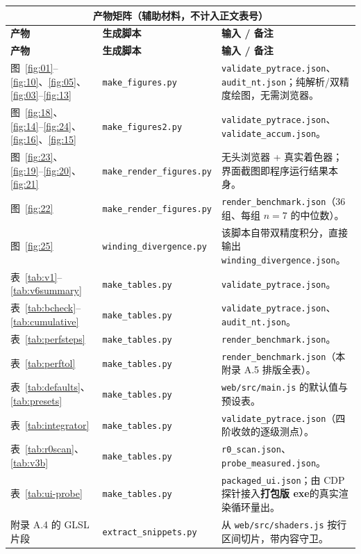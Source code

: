 \begingroup
\setlength{\LTpre}{4pt}
\setlength{\LTpost}{4pt}
\footnotesize
{}
\begin{longtable}{@{}p{3.35cm}p{4.95cm}p{6.0cm}@{}}
\multicolumn{3}{c}{\textbf{产物矩阵（辅助材料，不计入正文表号）}}\\[3pt]
\toprule
\textbf{产物} & \textbf{生成脚本} & \textbf{输入 / 备注}\\
\midrule
\endfirsthead
\toprule
\textbf{产物} & \textbf{生成脚本} & \textbf{输入 / 备注}\\
\midrule
\endhead
\bottomrule
\endlastfoot
图~\ref{fig:01}--\ref{fig:10}、\ref{fig:05}、\ref{fig:03}--\ref{fig:13} & \texttt{make\_figures.py} & \texttt{validate\_pytrace.json}、\texttt{audit\_nt.json}；纯解析/双精度绘图，无需浏览器。\\
图~\ref{fig:18}、\ref{fig:14}--\ref{fig:24}、\ref{fig:16}、\ref{fig:15} & \texttt{make\_figures2.py} & \texttt{validate\_pytrace.json}、\texttt{validate\_accum.json}。\\
图~\ref{fig:23}、\ref{fig:19}--\ref{fig:20}、\ref{fig:21} & \texttt{make\_render\_figures.py} & 无头浏览器 + 真实着色器；界面截图即程序运行结果本身。\\
图~\ref{fig:22} & \texttt{make\_render\_figures.py} & \texttt{render\_benchmark.json}（36 组、每组 $n=7$ 的中位数）。\\
图~\ref{fig:25} & \texttt{winding\_divergence.py} & 该脚本自带双精度积分，直接输出 \texttt{winding\_divergence.json}。\\
表~\ref{tab:v1}--\ref{tab:v6summary} & \texttt{make\_tables.py} & \texttt{validate\_pytrace.json}。\\
表~\ref{tab:bcheck}--\ref{tab:cumulative} & \texttt{make\_tables.py} & \texttt{validate\_pytrace.json}、\texttt{audit\_nt.json}。\\
表~\ref{tab:perfsteps} & \texttt{make\_tables.py} & \texttt{render\_benchmark.json}。\\
表~\ref{tab:perftol} & \texttt{make\_tables.py} & \texttt{render\_benchmark.json}（本附录 A.5 排版全表）。\\
表~\ref{tab:defaults}、\ref{tab:presets} & \texttt{make\_tables.py} & \texttt{web/src/main.js} 的默认值与预设表。\\
表~\ref{tab:integrator} & \texttt{make\_tables.py} & \texttt{validate\_pytrace.json}（四阶收敛的逐级测点）。\\
表~\ref{tab:r0scan}、\ref{tab:v3b} & \texttt{make\_tables.py} & \texttt{r0\_scan.json}、\texttt{probe\_measured.json}。\\
表~\ref{tab:ui-probe} & \texttt{make\_tables.py} & \texttt{packaged\_ui.json}；由 CDP 探针接入\textbf{打包版 exe}的真实渲染循环量出。\\
附录 A.4 的 GLSL 片段 & \texttt{extract\_snippets.py} & 从 \texttt{web/src/shaders.js} 按行区间切片，带内容守卫。\\
\end{longtable}
\auxrestorecounter
\endgroup

